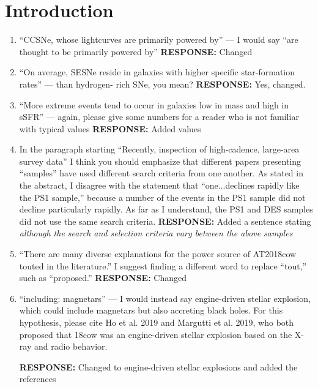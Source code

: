 \documentclass{article}
\begin{document}
\section*{Introduction}
\begin{enumerate}

\item “CCSNe, whose lightcurves are primarily powered by” — I would say “are thought to be primarily powered by”
\vskip0.1cm
{\bf RESPONSE: } Changed

\item “On average, SESNe reside in galaxies with higher specific star-formation rates” — than hydrogen- rich SNe, you mean?
\vskip0.1cm
{\bf RESPONSE: } Yes, changed.

\item “More extreme events tend to occur in galaxies low in mass and high in sSFR” — again, please give some numbers for a reader who is not familiar with typical values
\vskip0.1cm
{\bf RESPONSE: } Added values

\item In the paragraph starting “Recently, inspection of high-cadence, large-area survey data” I think you should emphasize that different papers presenting “samples” have used different search criteria from one another. As stated in the abstract, I disagree with the statement that “one...declines rapidly like the PS1 sample,” because a number of the events in the PS1 sample did not decline particularly rapidly. As far as I understand, the PS1 and DES samples did not use the same search criteria.
\vskip0.1cm
{\bf RESPONSE: } Added a sentence stating \textit{although the search and selection criteria vary between the above samples}

\item “There are many diverse explanations for the power source of AT2018cow touted in the literature.” I suggest finding a different word to replace “tout,” such as “proposed.”
\vskip0.1cm
{\bf RESPONSE: } Changed

\item “including: magnetars” — I would instead say engine-driven stellar explosion, which could include magnetars but also accreting black holes. For this hypothesis, please cite Ho et al. 2019 and Margutti et al. 2019, who both proposed that 18cow was an engine-driven stellar explosion based on the X-ray and radio behavior.

\vskip0.1cm
{\bf RESPONSE: } Changed to engine-driven stellar explosions and added the references


\end{enumerate}
\end{document}
